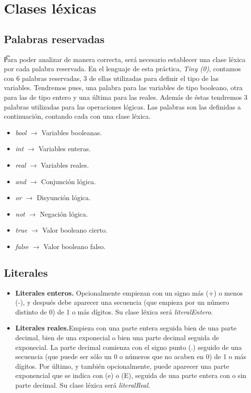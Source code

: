 \section{Clases léxicas}

\subsection{Palabras reservadas}

\t Para poder analizar de manera correcta, será necesario establecer una clase léxica por cada palabra reservada. En el lenguaje de
esta práctica, \textit{Tiny (0)}, contamos con 6 palabras reservadas, 3 de ellas utilizadas para definir el tipo de las variables.
Tendremos pues, una palabra para las variables de tipo booleano, otra para las de tipo entero y una última para las reales. Además
de éstas tendremos 3 palabras utilizadas para las operaciones lógicas. Las palabras son las definidas a continuación, contando cada con
una clase léxica.

\begin{itemize}
    \item \textit{bool} $\rightarrow$ Variables booleanas.
    \item \textit{int} $\rightarrow$ Variables enteras.
    \item \textit{real} $\rightarrow$ Variables reales.
    \item \textit{and} $\rightarrow$ Conjunción lógica.
    \item \textit{or} $\rightarrow$ Disyunción lógica.
    \item \textit{not} $\rightarrow$ Negación lógica.
    \item \textit{true} $\rightarrow$ Valor booleano cierto.
    \item \textit{false} $\rightarrow$ Valor booleano falso.
\end{itemize}

\subsection{Literales}

\begin{itemize}
    \item \textbf{Literales enteros.} Opcionalmente empiezan con un signo más (+) o menos (-), y después debe aparecer una
        secuencia (que empieza por un número distinto de 0) de 1 o más dígitos. Su clase léxica será \textit{literalEntero}.
    \item \textbf{Literales reales.}Empieza con una parte entera seguida bien de una parte decimal, bien de una exponecial o bien una parte decimal seguida de exponecial. La parte decimal comienza con el signo punto (.) seguido de una secuencia (que puede ser sólo un 0 o números que no acaben en 0) de 1 o más dígitos. Por último, y también opcionalmente, puede aparecer una parte exponencial que se indica con (e) o (E), seguida de una parte entera con o sin parte decimal. Su clase léxica será \textit{literalReal}.
\end{itemize}

